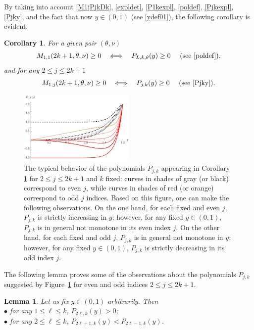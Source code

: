 \documentclass[a4paper]{article}
\newtheorem{lemma}{Lemma}
\newtheorem{corollary}{Corollary}
\newcommand{\te}{\theta}
\newcommand{\Pol}{P_{L,k,\te}(y)}
\begin{document}
By taking into account \eqref{M1jPjkDk}, \eqref{expldet}, \eqref{P1kexpl}, \eqref{poldef}, \eqref{Pjkexpl}, \eqref{Pjky}, and the fact that now $y\in(0,1)$ (see \eqref{ydef01}), the following corollary is evident.
\begin{corollary}\label{cor2} For a given pair $(\te,\nu)$
\[
M_{1,1}(2k+1,\te,\nu)\ge 0 \quad \Longleftrightarrow \quad \Pol\ge 0\quad\text{ (see } \eqref{poldef}\text{)},
\]
and for any $2\le j\le 2k+1$
\[
M_{1,j}(2k+1,\te,\nu)\ge 0 \quad \Longleftrightarrow \quad P_{j,k}(y)\ge 0\quad\text{ (see } \eqref{Pjky}\text{)}.
\]
\end{corollary}
\begin{figure}
\begin{center}
\includegraphics[width=0.5\textwidth]{fig_excepttopleft.pdf}
\caption{The typical behavior of the polynomials $P_{j,k}$ appearing in Corollary \ref{cor2} for $2\le j\le 2k+1$ and $k$ fixed: curves in shades of gray (or black) correspond to even $j$, while curves in shades of red (or orange) correspond to odd $j$ indices. Based on this figure, one can make the following observations. On the one hand, for each fixed and even $j$, $P_{j,k}$ is strictly increasing in $y$; however, for any fixed $y\in(0,1)$, $P_{j,k}$ is in general not monotone in its even index $j$. On the other hand, for each fixed and odd $j$, $P_{j,k}$ is in general not monotone in $y$; however, for any fixed $y\in(0,1)$, $P_{j,k}$ is strictly decreasing in its odd index $j$.}\label{fig_excepttopleft}
\end{center}
\end{figure}
The following lemma proves some of the observations about the polynomials $P_{j,k}$ suggested by
Figure~\ref{fig_excepttopleft} for even and odd indices $2\le j\le 2k+1$.
\begin{lemma}\label{lem2} Let us fix $y\in(0,1)$ arbitrarily. Then\\
\indent $\bullet$ for any $1\le\ell\le k$, $P_{2\ell,k}(y)>0$;\\
\indent $\bullet$ for any $2\le\ell\le k$, $P_{2\ell+1,k}(y)<P_{2\ell-1,k}(y)$. 
\end{lemma}
\end{document}
